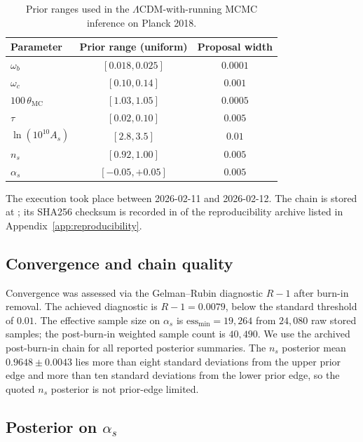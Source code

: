 ﻿\documentclass[12pt,a4paper]{article}
\theoremstyle{definition}
\begin{document}
\begin{table}[htbp]
\centering
\caption{Prior ranges used in the $\Lambda$CDM-with-running MCMC inference on Planck 2018.}
\label{tab:planck_priors}
\begin{tabular}{@{}lcc@{}}
\toprule
Parameter & Prior range (uniform) & Proposal width \\
\midrule
$\omega_b$ & $[0.018,0.025]$ & $0.0001$ \\
$\omega_c$ & $[0.10,0.14]$ & $0.001$ \\
$100\,\theta_{\mathrm{MC}}$ & $[1.03,1.05]$ & $0.0005$ \\
$\tau$ & $[0.02,0.10]$ & $0.005$ \\
$\ln(10^{10} A_s)$ & $[2.8,3.5]$ & $0.01$ \\
$n_s$ & $[0.92,1.00]$ & $0.005$ \\
$\alpha_s$ & $[-0.05,+0.05]$ & $0.005$ \\
\bottomrule
\end{tabular}
\end{table}

The execution took place between 2026-02-11 and 2026-02-12. The chain is stored at ; its SHA256 checksum is recorded in  of the reproducibility archive listed in Appendix~\ref{app:reproducibility}.

\subsection{Convergence and chain quality}
\label{sec:planck_convergence}

Convergence was assessed via the Gelman--Rubin diagnostic $R-1$ after burn-in removal. The achieved diagnostic is $R-1 = 0.0079$, below the standard threshold of $0.01$. The effective sample size on $\alpha_s$ is $\mathrm{ess}_{\min} = 19{,}264$ from $24{,}080$ raw stored samples; the post-burn-in weighted sample count is $40{,}490$. We use the archived post-burn-in chain for all reported posterior summaries. The $n_s$ posterior mean $0.9648 \pm 0.0043$ lies more than eight standard deviations from the upper prior edge and more than ten standard deviations from the lower prior edge, so the quoted $n_s$ posterior is not prior-edge limited.

\subsection[Posterior on alpha s]{Posterior on $\alpha_s$}
\label{sec:planck_posterior}
\end{document}
